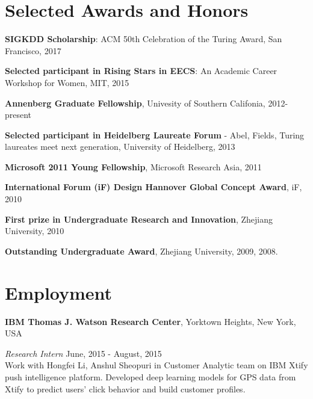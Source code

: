 \documentclass[margin,line]{res}
\begin{document}
\begin{resume}
\section{\sc Selected Awards and Honors} 

\textbf{SIGKDD Scholarship}: ACM 50th Celebration of the Turing Award, San Francisco, 2017

\textbf{Selected participant in Rising Stars in EECS}: An Academic Career Workshop for Women, MIT, 2015

\textbf{Annenberg Graduate Fellowship}, Univesity of Southern Califonia, 2012-present







%

\textbf{Selected participant in Heidelberg Laureate Forum }- Abel, Fields, Turing laureates meet next generation, University of Heidelberg, 2013


\textbf{Microsoft 2011 Young Fellowship}, Microsoft Research Asia, 2011


\textbf{International Forum (iF) Design Hannover Global Concept Award}, iF, 2010 

\textbf{First prize in Undergraduate Research and Innovation}, Zhejiang University, 2010   

\textbf{Outstanding Undergraduate Award}, Zhejiang University, 2009, 2008. 

\section{\sc Employment} 
{\bf  IBM Thomas J. Watson Research Center}, Yorktown Heights, New York, USA

\vspace{-.3cm}
{\em Research Intern} \hfill { June, 2015 - August, 2015}\\
Work with Hongfei Li, Anshul Sheopuri in Customer Analytic team on IBM Xtify push intelligence platform. Developed deep learning models for GPS data from Xtify to predict users' click behavior and build customer profiles. 



\end{resume}
\end{document}
